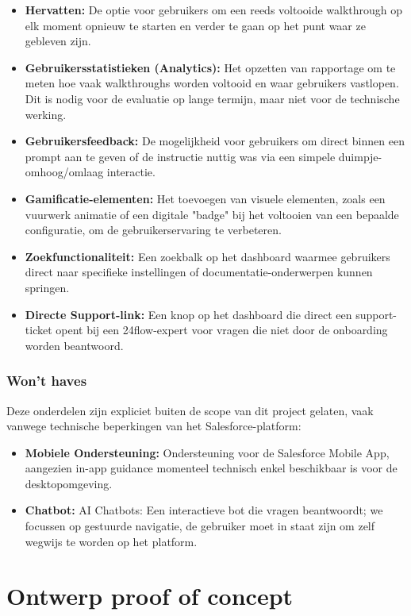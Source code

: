 \begin{itemize}
	\item \textbf{Hervatten:} De optie voor gebruikers om een reeds voltooide walkthrough op elk moment opnieuw te starten en verder te gaan op het punt waar ze gebleven zijn.
	\item \textbf{Gebruikersstatistieken (Analytics):} Het opzetten van rapportage om te meten hoe vaak walkthroughs worden voltooid en waar gebruikers vastlopen. Dit is nodig voor de evaluatie op lange termijn, maar niet voor de technische werking.
	\item \textbf{Gebruikersfeedback:} De mogelijkheid voor gebruikers om direct binnen een prompt aan te geven of de instructie nuttig was via een simpele duimpje-omhoog/omlaag interactie.
	\item \textbf{Gamificatie-elementen:} Het toevoegen van visuele elementen, zoals een vuurwerk animatie of een digitale "badge" bij het voltooien van een bepaalde configuratie, om de gebruikerservaring te verbeteren.
	\item \textbf{Zoekfunctionaliteit:} Een zoekbalk op het dashboard waarmee gebruikers direct naar specifieke instellingen of documentatie-onderwerpen kunnen springen.
	\item \textbf{Directe Support-link:} Een knop op het dashboard die direct een support-ticket opent bij een 24flow-expert voor vragen die niet door de onboarding worden beantwoord.
\end{itemize}

\subsubsection{Won't haves}
Deze onderdelen zijn expliciet buiten de scope van dit project gelaten, vaak vanwege technische beperkingen van het Salesforce-platform:

\begin{itemize}
	\item \textbf{Mobiele Ondersteuning:} Ondersteuning voor de Salesforce Mobile App, aangezien in-app guidance momenteel technisch enkel beschikbaar is voor de desktopomgeving.
	\item \textbf{Chatbot:} AI Chatbots: Een interactieve bot die vragen beantwoordt; we focussen op gestuurde navigatie, de gebruiker moet in staat zijn om zelf wegwijs te worden op het platform.
\end{itemize}

\section{Ontwerp proof of concept}
\label{sec:Ontwerp}

